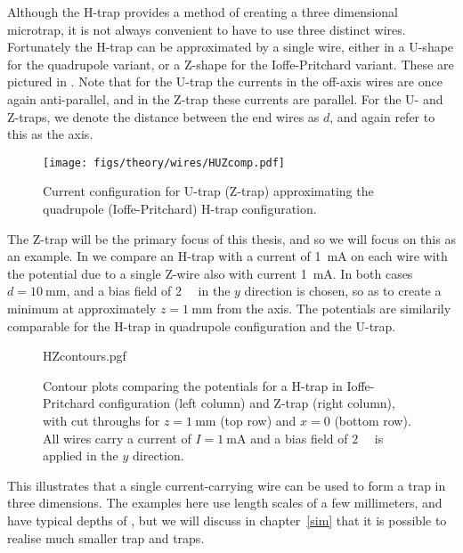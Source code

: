 Although the H-trap provides a method of creating a three dimensional
microtrap, it is not always convenient to have to use three distinct wires.
Fortunately the H-trap can be approximated by a single wire, either in a
U-shape for the quadrupole variant, or a Z-shape for the Ioffe-Pritchard
variant. These are pictured in . Note that for the U-trap
the currents in the off-axis wires are once again anti-parallel, and in the
Z-trap these currents are parallel. For the U- and Z-traps, we denote the
distance between the end wires as $d$, and again refer to this as the axis.

\begin{figure}[htbp]
  \centering
  \texttt{[image: figs/theory/wires/HUZcomp.pdf]}
  \caption{Current configuration for U-trap (Z-trap) approximating the
  quadrupole (Ioffe-Pritchard) H-trap configuration.}
  \label{theory:fig:HUZ}
\end{figure}

The Z-trap will be the primary focus of this thesis, and so we will focus on
this as an example. In  we compare an H-trap
with a current of \SI{1}{\milli\ampere} on each wire with the potential due to
a single Z-wire also with current \SI{1}{\milli\ampere}. In both cases
$d=\SI{10}{\milli\meter}$, and a bias field of \SI{2}{\milli\gauss} in the $y$
direction is chosen, so as to create a minimum at approximately
$z=\SI{1}{\milli\meter}$ from the axis. The potentials are similarily
comparable for the H-trap in quadrupole configuration and the U-trap.

\begin{figure}[htbp]
  \centering
  {HZcontours.pgf}
  \caption{Contour plots comparing the potentials for a H-trap in
    Ioffe-Pritchard configuration (left column) and Z-trap (right column), with
    cut throughs for $z=\SI{1}{\milli\meter}$ (top row) and $x=0$ (bottom row).
    All wires carry a current of $I=\SI{1}{\milli\ampere}$ and a bias field of
    \SI{2}{\milli\gauss} is applied in the $y$ direction.}
  \label{theory:fig:HZcontours}
\end{figure}

This illustrates that a single current-carrying wire can be used to form a trap
in three dimensions. The examples here use length scales of a few millimeters,
and have typical depths of , but we will discuss in chapter~\ref{sim}
that it is possible to realise much smaller trap and  traps.


